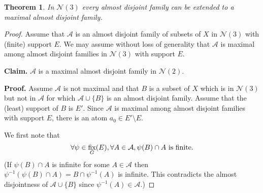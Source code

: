 \documentclass[12pt,notitlepage]{amsart}
\newtheorem{theorem}{Theorem}
\DeclareMathOperator{\fix}{{\rm fix}}
\begin{document}
\begin{theorem}
In $\mathcal{N}(3)$ every almost disjoint family can be extended to a maximal almost disjoint family.
\end{theorem}

\begin{proof}
Assume that $\mathcal{A}$ is an almost disjoint family of subsets of $X$ in $\mathcal{N}(3)$ with (finite) support $E$.  We may assume without loss of generality that $\mathcal{A}$ is maximal among almost disjoint families in $\mathcal{N}(3)$ with support $E$.  
\par\noindent\textbf{Claim.}  $\mathcal{A}$ is a maximal almost disjoint family in $\mathcal{N}(2)$.
\par\noindent\textbf{Proof.}  Assume $\mathcal{A}$ is not maximal and that $B$ is a subset of $X$ which is in $\mathcal{N}(3)$ but not in $\mathcal{A}$ for which $\mathcal{A} \cup \{ B  \}$ is an almost disjoint family.  Assume that the (least) support of $B$ is $E'$.  Since $\mathcal{A}$ is maximal among almost disjoint families with support $E$, there is an atom $a_0 \in E' \setminus E$.

We first note that 
\begin{equation} \label{E:forallphi}
\forall \psi \in \fix_G(E), \forall A \in \mathcal{A}, \psi(B) \cap A \mbox{ is finite.}
\end{equation}
(If $\psi(B) \cap A$ is infinite for some $A \in \mathcal{A}$ then $\psi^{-1}(\psi(B) \cap A) = B \cap \psi^{-1}(A)$ is infinite.  This contradicts the almost disjointness of $\mathcal{A} \cup \{ B \}$ since $\psi^{-1}(A) \in \mathcal{A}$.)


\end{proof}
\end{document}
